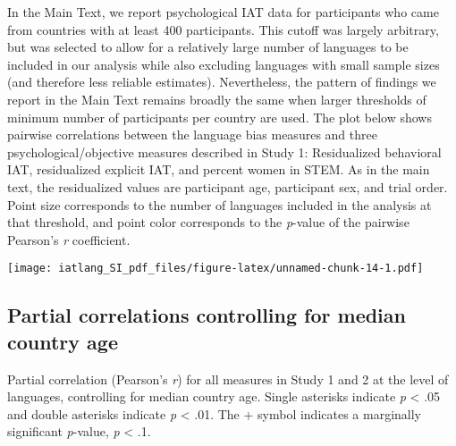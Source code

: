 \documentclass[]{article}
\begin{document}
In the Main Text, we report psychological IAT data for participants who
came from countries with at least 400 participants. This cutoff was
largely arbitrary, but was selected to allow for a relatively large
number of languages to be included in our analysis while also excluding
languages with small sample sizes (and therefore less reliable
estimates). Nevertheless, the pattern of findings we report in the Main
Text remains broadly the same when larger thresholds of minimum number
of participants per country are used. The plot below shows pairwise
correlations between the language bias measures and three
psychological/objective measures described in Study 1: Residualized
behavioral IAT, residualized explicit IAT, and percent women in STEM. As
in the main text, the residualized values are participant age,
participant sex, and trial order. Point size corresponds to the number
of languages included in the analysis at that threshold, and point color
corresponds to the \emph{p}-value of the pairwise Pearson's \emph{r}
coefficient.

\texttt{[image: iatlang\_SI\_pdf\_files/figure-latex/unnamed-chunk-14-1.pdf]}

\hypertarget{partial-correlations-controlling-for-median-country-age}{%
\subsection{Partial correlations controlling for median country
age}\label{partial-correlations-controlling-for-median-country-age}}

Partial correlation (Pearson's \emph{r}) for all measures in Study 1 and
2 at the level of languages, controlling for median country age. Single
asterisks indicate \emph{p} \textless{} .05 and double asterisks
indicate \emph{p} \textless{} .01. The + symbol indicates a marginally
significant \emph{p}-value, \emph{p} \textless{} .1.
\end{document}

